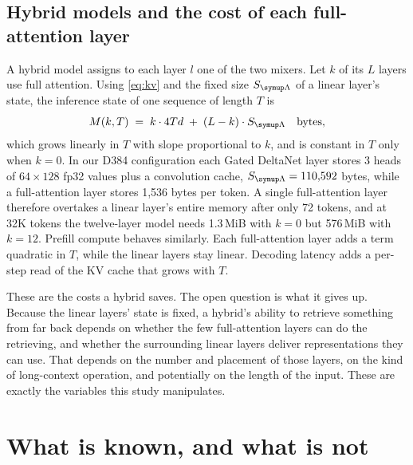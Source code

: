 \documentclass[10pt,a4paper]{article}
\begin{document}
\subsection{Hybrid models and the cost of each full-attention layer}\label{sec:hybridcost}
A hybrid model assigns to each layer $l$ one of the two mixers. Let $k$ of its $L$ layers use full
attention. Using \cref{eq:kv} and the fixed size $S_{\Lin}$ of a linear layer's state, the inference
state of one sequence of length $T$ is
\begin{equation}\label{eq:state}
  M(k,T) \;=\; k\cdot 4Td \;+\; (L-k)\cdot S_{\Lin}\quad\text{bytes},
\end{equation}
which grows linearly in $T$ with slope proportional to $k$, and is constant in $T$ only when $k=0$.
In our D384 configuration each Gated DeltaNet layer stores 3 heads of $64\times128$ fp32 values plus
a convolution cache, $S_{\Lin}=110{,}592$ bytes, while a full-attention layer stores 1,536 bytes per
token. A single full-attention layer therefore overtakes a linear layer's entire memory after only
72 tokens, and at 32K tokens the twelve-layer model needs 1.3\,MiB with $k=0$ but 576\,MiB with
$k=12$. Prefill compute behaves similarly. Each full-attention layer adds a term quadratic in $T$,
while the linear layers stay linear. Decoding latency adds a per-step read of the KV cache that
grows with $T$.

These are the costs a hybrid saves. The open question is what it gives up. Because the linear layers'
state is fixed, a hybrid's ability to retrieve something from far back depends on whether the few
full-attention layers can do the retrieving, and whether the surrounding linear layers deliver
representations they can use. That depends on the number and placement of those layers, on the kind
of long-context operation, and potentially on the length of the input. These are exactly the
variables this study manipulates.

\section{What is known, and what is not}\label{sec:related}
\end{document}
